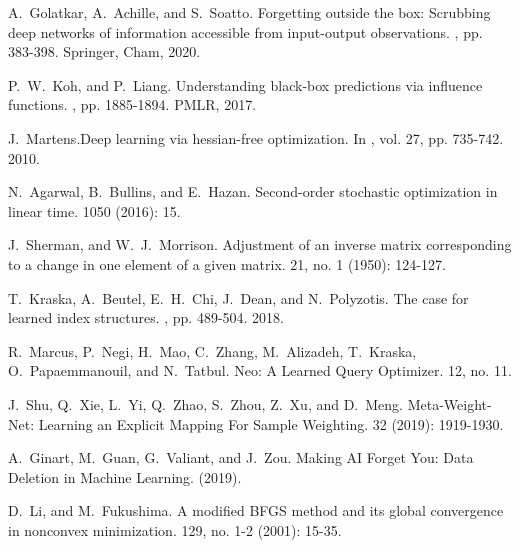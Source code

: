 \documentclass[11pt]{article}
\begin{document}
\begin{thebibliography}{10}
\begin{small}
 A.~Golatkar, A.~Achille, and S.~Soatto. \newblock Forgetting outside the box: Scrubbing deep networks of information accessible from input-output observations. , pp. 383-398. Springer, Cham, 2020.

 P.~W.~Koh, and P.~Liang. \newblock Understanding black-box predictions via influence functions. , pp. 1885-1894. PMLR, 2017.

 J.~Martens.\newblock Deep learning via hessian-free optimization. In , vol. 27, pp. 735-742. 2010.


 N.~Agarwal, B.~Bullins, and E.~Hazan. \newblock Second-order stochastic optimization in linear time.  1050 (2016): 15.

 J.~Sherman, and W.~J.~Morrison. \newblock Adjustment of an inverse matrix corresponding to a change in one element of a given matrix.  21, no. 1 (1950): 124-127.

 T.~Kraska, A.~Beutel, E.~H.~Chi, J.~Dean, and N.~Polyzotis. \newblock The case for learned index structures. , pp. 489-504. 2018.


 R.~Marcus, P.~Negi, H.~Mao, C.~Zhang, M.~Alizadeh, T.~Kraska, O.~Papaemmanouil, and N.~Tatbul. \newblock Neo: A Learned Query Optimizer.  12, no. 11.

 J.~Shu, Q.~Xie, L.~Yi, Q.~Zhao, S.~Zhou, Z.~Xu, and D.~Meng. \newblock Meta-Weight-Net: Learning an Explicit Mapping For Sample Weighting.  32 (2019): 1919-1930.

 A.~Ginart, M.~Guan, G.~Valiant, and J.~Zou. \newblock Making AI Forget You: Data Deletion in Machine Learning.  (2019).

 D.~Li, and M.~Fukushima. \newblock A modified BFGS method and its global convergence in nonconvex minimization.  129, no. 1-2 (2001): 15-35.


\end{small}
\end{thebibliography}
\end{document}
